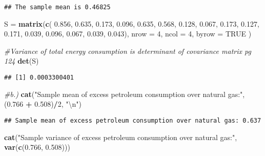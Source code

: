 \documentclass[
]{article}
\newenvironment{Shaded}{\begin{snugshade}}{\end{snugshade}}
\newcommand{\CharTok}[1]{\textcolor[rgb]{0.31,0.60,0.02}{#1}}
\newcommand{\CommentTok}[1]{\textcolor[rgb]{0.56,0.35,0.01}{\textit{#1}}}
\newcommand{\DataTypeTok}[1]{\textcolor[rgb]{0.13,0.29,0.53}{#1}}
\newcommand{\DecValTok}[1]{\textcolor[rgb]{0.00,0.00,0.81}{#1}}
\newcommand{\FloatTok}[1]{\textcolor[rgb]{0.00,0.00,0.81}{#1}}
\newcommand{\KeywordTok}[1]{\textcolor[rgb]{0.13,0.29,0.53}{\textbf{#1}}}
\newcommand{\NormalTok}[1]{#1}
\newcommand{\OperatorTok}[1]{\textcolor[rgb]{0.81,0.36,0.00}{\textbf{#1}}}
\newcommand{\OtherTok}[1]{\textcolor[rgb]{0.56,0.35,0.01}{#1}}
\newcommand{\StringTok}[1]{\textcolor[rgb]{0.31,0.60,0.02}{#1}}
\begin{document}
\begin{verbatim}
## The sample mean is 0.46825
\end{verbatim}

\begin{Shaded}
\begin{Highlighting}[]
\NormalTok{S =}\StringTok{ }\KeywordTok{matrix}\NormalTok{(}\KeywordTok{c}\NormalTok{(}
  \FloatTok{0.856}\NormalTok{,}
  \FloatTok{0.635}\NormalTok{,}
  \FloatTok{0.173}\NormalTok{,}
  \FloatTok{0.096}\NormalTok{,}
  \FloatTok{0.635}\NormalTok{,}
  \FloatTok{0.568}\NormalTok{,}
  \FloatTok{0.128}\NormalTok{,}
  \FloatTok{0.067}\NormalTok{,}
  \FloatTok{0.173}\NormalTok{,}
  \FloatTok{0.127}\NormalTok{,}
  \FloatTok{0.171}\NormalTok{,}
  \FloatTok{0.039}\NormalTok{,}
  \FloatTok{0.096}\NormalTok{,}
  \FloatTok{0.067}\NormalTok{,}
  \FloatTok{0.039}\NormalTok{,}
  \FloatTok{0.043}\NormalTok{), }\DataTypeTok{nrow =} \DecValTok{4}\NormalTok{, }\DataTypeTok{ncol =} \DecValTok{4}\NormalTok{, }\DataTypeTok{byrow =} \OtherTok{TRUE}
\NormalTok{)}

\CommentTok{#Variance of total energy consumption is determinant of covariance matrix pg 124}
\KeywordTok{det}\NormalTok{(S)}
\end{Highlighting}
\end{Shaded}

\begin{verbatim}
## [1] 0.0003300401
\end{verbatim}

\begin{Shaded}
\begin{Highlighting}[]
\CommentTok{#b.)}
\KeywordTok{cat}\NormalTok{(}\StringTok{"Sample mean of excess petroleum consumption over natural gas:"}\NormalTok{, (}\FloatTok{0.766} \OperatorTok{+}\StringTok{ }\FloatTok{0.508}\NormalTok{)}\OperatorTok{/}\DecValTok{2}\NormalTok{, }\StringTok{"}\CharTok{\textbackslash{}n}\StringTok{"}\NormalTok{) }
\end{Highlighting}
\end{Shaded}

\begin{verbatim}
## Sample mean of excess petroleum consumption over natural gas: 0.637
\end{verbatim}

\begin{Shaded}
\begin{Highlighting}[]
\KeywordTok{cat}\NormalTok{(}\StringTok{"Sample variance of excess petroleum consumption over natural gas:"}\NormalTok{, }\KeywordTok{var}\NormalTok{(}\KeywordTok{c}\NormalTok{(}\FloatTok{0.766}\NormalTok{, }\FloatTok{0.508}\NormalTok{)))}
\end{Highlighting}
\end{Shaded}
\end{document}
